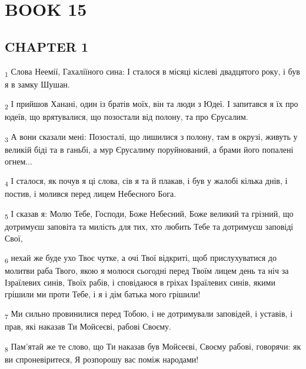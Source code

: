 \section{BOOK 15}
\subsection{CHAPTER 1}
\begin{tcolorbox}
\textsubscript{1} Слова Неемії, Гахаліїного сина: І сталося в місяці кіслеві двадцятого року, і був я в замку Шушан.
\end{tcolorbox}
\begin{tcolorbox}
\textsubscript{2} І прийшов Ханані, один із братів моїх, він та люди з Юдеї. І запитався я їх про юдеїв, що врятувалися, що позостали від полону, та про Єрусалим.
\end{tcolorbox}
\begin{tcolorbox}
\textsubscript{3} А вони сказали мені: Позосталі, що лишилися з полону, там в окрузі, живуть у великій біді та в ганьбі, а мур Єрусалиму поруйнований, а брами його попалені огнем...
\end{tcolorbox}
\begin{tcolorbox}
\textsubscript{4} І сталося, як почув я ці слова, сів я та й плакав, і був у жалобі кілька днів, і постив, і молився перед лицем Небесного Бога.
\end{tcolorbox}
\begin{tcolorbox}
\textsubscript{5} І сказав я: Молю Тебе, Господи, Боже Небесний, Боже великий та грізний, що дотримуєш заповіта та милість для тих, хто любить Тебе та дотримуєш заповіді Свої,
\end{tcolorbox}
\begin{tcolorbox}
\textsubscript{6} нехай же буде ухо Твоє чутке, а очі Твої відкриті, щоб прислухуватися до молитви раба Твого, якою я молюся сьогодні перед Твоїм лицем день та ніч за Ізраїлевих синів, Твоїх рабів, і сповідаюся в гріхах Ізраїлевих синів, якими грішили ми проти Тебе, і я і дім батька мого грішили!
\end{tcolorbox}
\begin{tcolorbox}
\textsubscript{7} Ми сильно провинилися перед Тобою, і не дотримували заповідей, і уставів, і прав, які наказав Ти Мойсеєві, рабові Своєму.
\end{tcolorbox}
\begin{tcolorbox}
\textsubscript{8} Пам'ятай же те слово, що Ти наказав був Мойсеєві, Своєму рабові, говорячи: як ви спроневіритеся, Я розпорошу вас поміж народами!
\end{tcolorbox}
